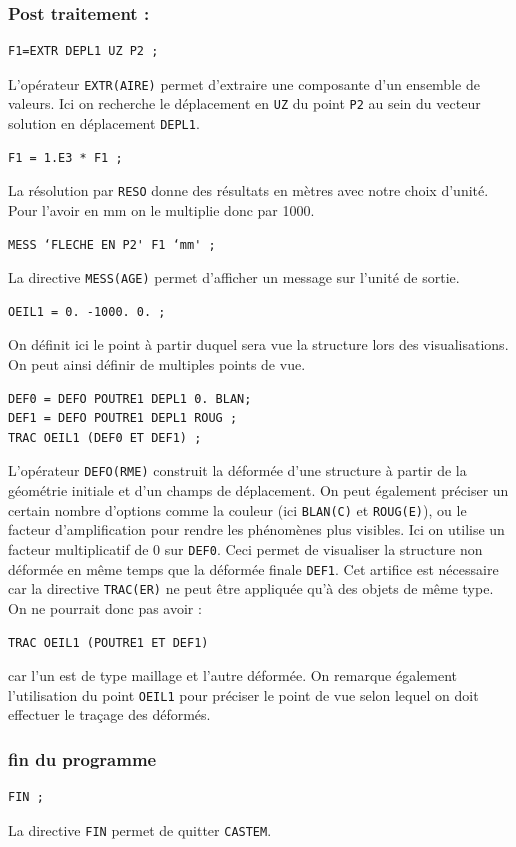 \documentclass[a4paper,multicol]{article}
\begin{document}
\subsubsection*{Post traitement :}
 \begin{verbatim}
F1=EXTR DEPL1 UZ P2 ;
\end{verbatim}
L'opérateur {\tt EXTR(AIRE)} permet d'extraire une composante d'un ensemble de valeurs. Ici on recherche le déplacement en {\tt UZ} du point {\tt P2} au sein du vecteur solution en déplacement {\tt DEPL1}.
 \begin{verbatim}
F1 = 1.E3 * F1 ;
\end{verbatim}
La résolution par {\tt RESO} donne des résultats en mètres avec notre choix d'unité. Pour l'avoir en mm on le multiplie donc par 1000.
 \begin{verbatim}
MESS ‘FLECHE EN P2' F1 ‘mm' ;
\end{verbatim}
La directive {\tt MESS(AGE)} permet d'afficher un message sur l'unité de sortie.
 \begin{verbatim}
OEIL1 = 0. -1000. 0. ;
\end{verbatim}
On définit ici le point à partir duquel sera vue la structure lors des visualisations. On peut ainsi définir de multiples points de vue.
 \begin{verbatim}
DEF0 = DEFO POUTRE1 DEPL1 0. BLAN;
DEF1 = DEFO POUTRE1 DEPL1 ROUG ;
TRAC OEIL1 (DEF0 ET DEF1) ;
\end{verbatim}
L'opérateur {\tt DEFO(RME)} construit la déformée d'une structure à partir de la géométrie initiale et d'un champs de déplacement. On peut également préciser un certain nombre d'options comme la couleur (ici {\tt BLAN(C)} et {\tt ROUG(E)}), ou le facteur d'amplification pour
rendre les phénomènes plus visibles. Ici on utilise un facteur multiplicatif de 0 sur {\tt DEF0}. Ceci permet de visualiser la structure non déformée en même temps que la déformée finale {\tt DEF1}. Cet artifice est nécessaire car la directive {\tt TRAC(ER)} ne peut être appliquée qu'à des objets de même type. On ne pourrait donc pas avoir : 
 \begin{verbatim}
TRAC OEIL1 (POUTRE1 ET DEF1) 
\end{verbatim}
car l'un est de type maillage et l'autre déformée. On remarque également
l'utilisation du point {\tt OEIL1} pour préciser le point de vue selon lequel on doit effectuer le traçage des déformés.

\subsubsection*{fin du programme }
 \begin{verbatim}
FIN ;
\end{verbatim}
La directive {\tt FIN} permet de quitter {\tt CASTEM}.
\end{document}
